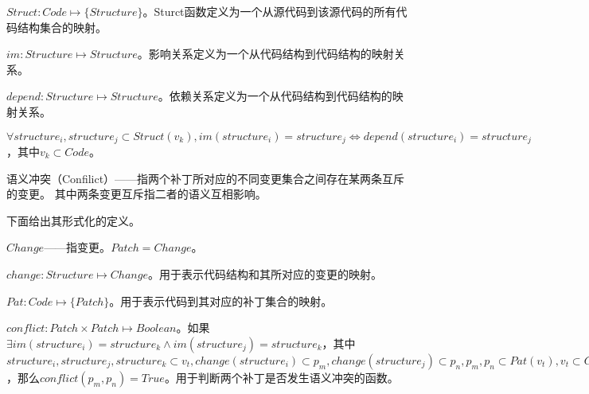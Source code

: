 \begin{definition}
	$Struct: Code \mapsto \{ Structure \}$。Sturct函数定义为一个从源代码到该源代码的所有代码结构集合的映射。
\end{definition}

\begin{definition}
	$im: Structure \mapsto Structure$。影响关系定义为一个从代码结构到代码结构的映射关系。
\end{definition}

\begin{definition}
	$depend: Structure \mapsto Structure$。依赖关系定义为一个从代码结构到代码结构的映射关系。
\end{definition}

\begin{definition}
	$\forall structure_i,structure_j \subset Struct(v_k),  im(structure_i) = structure_j \iff depend(structure_i) = structure_j$，其中$v_k \subset Code$。
\end{definition}


\begin{definition}
	\label {define_conflict}
	语义冲突（Confilict）——指两个补丁所对应的不同变更集合之间存在某两条互斥的变更。
	其中两条变更互斥指二者的语义互相影响。
\end{definition}

下面给出其形式化的定义。

\begin{definition}
	$Change$——指变更。$Patch = {Change}$。
\end{definition}

\begin{definition}
	$change: Structure \mapsto Change$。用于表示代码结构和其所对应的变更的映射。
\end{definition}

\begin{definition}
	$Pat: Code \mapsto \{Patch\}$。用于表示代码到其对应的补丁集合的映射。
\end{definition}

\begin{definition}
	$conflict: Patch \times Patch \mapsto Boolean$。如果$\exists im(structure_i) = structure_k \land im(structure_j) = structure_k$，其中$structure_i,structure_j,structure_k \subset v_t,change(structure_i) \subset p_m,change(structure_j) \subset p_n,p_m,p_n \subset Pat(v_t),v_t \subset Code,i,j,k,m,n,t \subset \mathbb{N}$，那么$conflict(p_m,p_n) = True$。用于判断两个补丁是否发生语义冲突的函数。
\end{definition}

